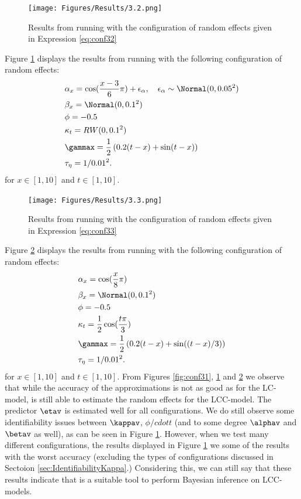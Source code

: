 \begin{figure}[h!]
    \centering
    \texttt{[image: Figures/Results/3.2.png]}
    \caption{Results from running \inlabru with the configuration of random effects given in Expression \ref{eq:conf32}}
    \label{fig:conf32}
\end{figure}
Figure \ref{fig:conf32} displays the results from running \inlabru with the following configuration of random effects:
\begin{equation}
    \begin{aligned}
        &\alpha_x = \cos(\frac{x-3}{6}\pi) + \epsilon_{\alpha}, \quad \epsilon_{\alpha} \sim \Normal(0,0.05^2)\\
        &\beta_x = \Normal(0,0.1^2)\\
        &\phi = -0.5\\
        &\kappa_t = RW(0,0.1^2)\\
        &\gammax = \frac{1}{2}\left( 0.2(t-x) + \sin(t-x)\right)\\
        &\tau_{\eta} = 1/0.01^2.
    \end{aligned}
    \label{eq:conf32}
\end{equation}
for $x\in[1,10]$ and $t \in [1,10]$. 

\begin{figure}[h!]
    \centering
    \texttt{[image: Figures/Results/3.3.png]}
    \caption{Results from running \inlabru with the configuration of random effects given in Expression \ref{eq:conf33}}
    \label{fig:conf33}
\end{figure}
Figure \ref{fig:conf33} displays the results from running \inlabru with the following configuration of random effects:
\begin{equation}
    \begin{aligned}
        &\alpha_x = \cos(\frac{x}{8}\pi)\\
        &\beta_x = \Normal(0,0.1^2)\\
        &\phi = -0.5\\
        &\kappa_t = \frac{1}{2}\cos(\frac{t\pi}{3})\\
        &\gammax = \frac{1}{2}\left( 0.2(t-x) + \sin((t-x)/3)\right)\\
        &\tau_{\eta} = 1/0.01^2.
    \end{aligned}
    \label{eq:conf33}
\end{equation}
for $x\in[1,10]$ and $t \in [1,10]$. 
From Figures \ref{fig:conf31}, \ref{fig:conf32} and \ref{fig:conf33} we observe that while the accuracy of the approximations is not as good as for the LC-model, \inlabru is still able to estimate the random effects for the LCC-model. The predictor $\etav$ is estimated well for all configurations. We do still observe some identifiability issues between $\kappav$, $\phi /cdot t$ (and to some degree $\alphav$ and $\betav$ as well), as can be seen in Figure \ref{fig:conf32}. However, when we test many different configurations, the results displayed in Figure \ref{fig:conf32} we some of the results with the worst accuracy (excluding the types of configurations discussed in Sectoion \ref{sec:IdentifiabilityKappa}.) Considering this, we can still say that these results indicate that \inlabru is a suitable tool to perform Bayesian inference on LCC-models. 
